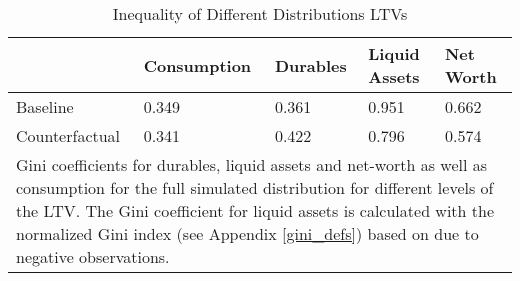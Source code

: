 \documentclass[a4paper,12pt,legno]{article}
\begin{document}
\begin{table}[!htbp]
\centering
\caption{Inequality of Different Distributions LTVs}
\label{Gini_Ranking_counter_factual}
\begin{tabular}{@{}lllll@{}}
\toprule
      & Consumption & Durables & Liquid Assets & Net Worth \\ \midrule
Baseline & 0.349       & 0.361   & 0.951        & 0.662    \\ \midrule
Counterfactual  & 0.341         & 0.422     & 0.796          & 0.574      \\ \bottomrule
\multicolumn{5}{l}{%
  \begin{minipage}{12.5cm}%
    \small Gini coefficients for durables, liquid assets and net-worth as well as consumption for the full simulated distribution for different levels of the LTV. The Gini coefficient for liquid assets is calculated with the normalized Gini index (see Appendix \ref{gini_defs}) based on \cite{chen1982} due to negative observations. 
  \end{minipage}%
}\\
\end{tabular}
\end{table}
\end{document}
